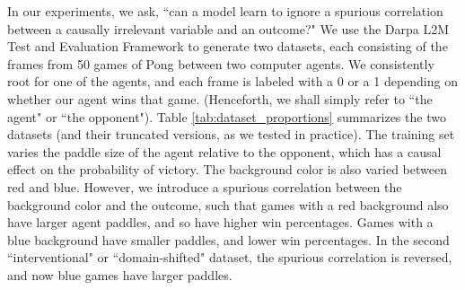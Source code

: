 \documentclass{article}
\begin{document}


In our experiments, we ask, ``can a model learn to ignore a spurious correlation between a causally irrelevant variable and an outcome?" We use the Darpa L2M Test and Evaluation Framework to generate two datasets, each consisting of the frames from 50 games of Pong between two computer agents. We consistently root for one of the agents, and each frame is labeled with a 0 or a 1 depending on whether our agent wins that game. (Henceforth, we shall simply refer to ``the agent" or ``the opponent"). Table \ref{tab:dataset_proportions} summarizes the two datasets (and their truncated versions, as we tested in practice). The training set varies the paddle size of the agent relative to the opponent, which has a causal effect on the probability of victory. The background color is also varied between red and blue. However, we introduce a spurious correlation between the background color and the outcome, such that games with a red background also have larger agent paddles, and so have higher win percentages. Games with a blue background have smaller paddles, and lower win percentages. In the second ``interventional" or ``domain-shifted" dataset, the spurious correlation is reversed, and now blue games have larger paddles.
\end{document}
